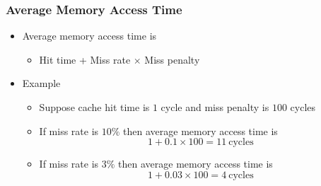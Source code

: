 \documentclass{beamer}
\newcounter{exo}
\newcommand{\exo}{
  \addtocounter{exo}{1}
  Exercice \arabic{exo}
}
\begin{document}
\begin{frame}[fragile]
\frametitle{Average Memory Access Time}

\begin{itemize}

\item Average memory access time is
  \begin{itemize}
  \item Hit time + Miss rate $\times$ Miss penalty
  \end{itemize}

  \vspace{0.5cm}

\item Example
  \begin{itemize}
  \item Suppose cache hit time is $1$ cycle and miss penalty is $100$ cycles
    \vspace{0.2cm}
  \item If miss rate is $10\%$ then average memory access time is
    $$
    1 + 0.1 \times 100 = 11 \ \text{cycles}
    $$
  \item If miss rate is $3\%$ then average memory access time is
    $$
    1 + 0.03 \times 100 = 4 \ \text{cycles}
    $$
    \end{itemize}
\end{itemize}

\end{frame}

\end{document}
